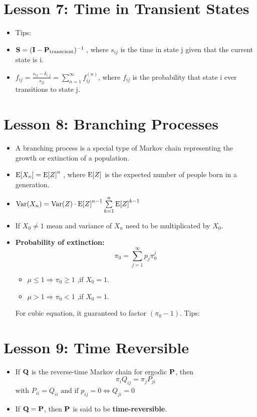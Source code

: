 \documentclass[10pt, french]{article}
\begin{document}
\begin{multicols*}{3}
\section*{Lesson 7: Time in Transient States}
\begin{itemize}[align=left,leftmargin=*]
    \item Tips: {\color{AppendixColor}}
    \item $\mathbf{S} = (\mathbf{I} - \mathbf{P}_{\text{transcient}})^{-1}\:$, where $s_{ij}$ is the time in state j given that the current state is i.
    \item $f_{ij} = \frac{s_{ij} - \delta_{i,j}}{s_{jj}} = \sum\limits_{n=1}^\infty f_{ij}^{(n)}$, where $f_{ij}$ is the probability that state i ever transitions to state j.
\end{itemize}

\section*{Lesson 8: Branching Processes}
\begin{itemize}[align=left,leftmargin=*]
    \item A branching process is a special type of Markov chain representing the growth or extinction of a population.
    \item $\mathrm{E} {\left[ X_n \right]} = \mathrm{E} {\left[ Z \right]}^n\:$, where $\mathrm{E} {\left[ Z \right]}$ is the expected number of people born in a generation.
    \item $\mathrm{Var} {\left( X_n \right)} = \mathrm{Var} {\left( Z \right)} \cdot \mathrm{E} {\left[ Z \right]}^{n-1} \sum\limits_{k=1}^n \mathrm{E} {\left[ Z \right]}^{k-1}$
    \item If $X_0\neq 1$ mean and variance of $X_n$ need to be multiplicated by $X_0$.
    \item \textbf{Probability of extinction:} $$\pi_0 = \sum\limits_{j=1}^\infty p_j \pi_0^j$$
    \begin{itemize}
        \item $\mu \leq 1 \Rightarrow \pi_0 \geq 1$ ,if $X_0 = 1$.
        \item $\mu > 1 \Rightarrow \pi_0 < 1$ ,if $X_0 = 1$.
    \end{itemize}
    For cubic equation, it guaranteed to factor $(\pi_0 - 1)$. Tips: {\color{AppendixColor}} 
\end{itemize}

\section*{Lesson 9: Time Reversible}
\begin{itemize}[align=left,leftmargin=*]
    \item If $\mathbf{Q}$ is the reverse-time Markov chain for ergodic $\mathbf{P}$, then \[ \pi_i Q_{ij} = \pi_j P_{ji} \] 
    with $P_{ii} = Q_{ii} \text{ and if } p_{ij} = 0 \Leftrightarrow Q_{ji} = 0$
    \item If ${\mathbf{Q} = \mathbf{P}}$, then $\mathbf{P}$ is said to be \textbf{time-reversible}.
\end{itemize}


\end{multicols*}
\end{document}
